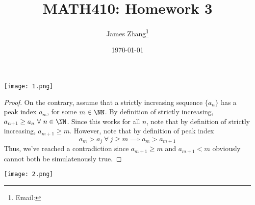 \documentclass[12pt]{scrartcl}
\begin{document}
\title{MATH410: Homework 3}
\author{James Zhang\thanks{Email: }}
\date{\today}



\maketitle

\texttt{[image: 1.png]}

\begin{proof}
  
\hfill

On the contrary, assume that a strictly increasing sequence $\{a_n\}$ has a peak index $a_m$, for some 
$m \in \NN$. By definition of strictly increasing, $a_{n+1} \geq a_n \ \forall \ n \in \NN$.
Since this works for all $n$, note that by definition of strictly increasing, $a_{m+1} \geq m$.
However, note that by definition of peak index
\[a_m > a_j \ \forall \ j \geq m \implies a_m > a_{m+1}\]
Thus, we've reached a contradiction since $a_{m+1} \geq m$ and $a_{m+1} < m$ obviously cannot
both be simulatenously true.
\end{proof}

\newpage

\texttt{[image: 2.png]}
\end{document}
